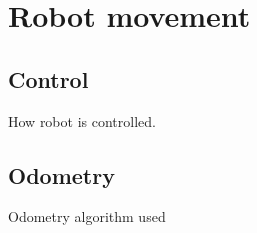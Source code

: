 \section{Robot movement}

\subsection{Control}

How robot is controlled. 

\subsection{Odometry}

Odometry algorithm used 


%	
%	
